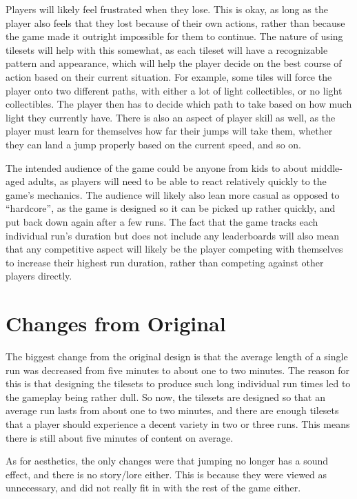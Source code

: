 \documentclass[10pt]{article}
\begin{document}
Players will likely feel frustrated when they lose. This is okay, as long as the player also feels that they
lost because of their own actions, rather than because the game made it outright impossible for them to continue.
The nature of using tilesets will help with this somewhat, as each tileset will have a recognizable pattern and appearance,
which will help the player decide on the best course of action based on their current situation. For example,
some tiles will force the player onto two different paths, with either a lot of light collectibles, or no light collectibles.
The player then has to decide which path to take based on how much light they currently have. There is also an aspect of
player skill as well, as the player must learn for themselves how far their jumps will take them, whether
they can land a jump properly based on the current speed, and so on.

The intended audience of the game could be anyone from kids to about middle-aged adults, as players will need to be able to
react relatively quickly to the game's mechanics. The audience will likely also lean more casual as opposed to ``hardcore'',
as the game is designed so it can be picked up rather quickly, and put back down again after a few runs. The fact that the
game tracks each individual run's duration but does not include any leaderboards will also mean that any competitive aspect
will likely be the player competing with themselves to increase their highest run duration, rather than competing against
other players directly.

\section{Changes from Original}

The biggest change from the original design is that the average length of a single run was decreased from five minutes to about one to two minutes.
The reason for this is that designing the tilesets to produce such long individual run times led to the gameplay being rather dull.
So now, the tilesets are designed so that an average run lasts from about one to two minutes, and there are enough tilesets that a player
should experience a decent variety in two or three runs. This means there is still about five minutes of content on average.

As for aesthetics, the only changes were that jumping no longer has a sound effect, and there is no story/lore either.
This is because they were viewed as unnecessary, and did not really fit in with the rest of the game either.
\end{document}

